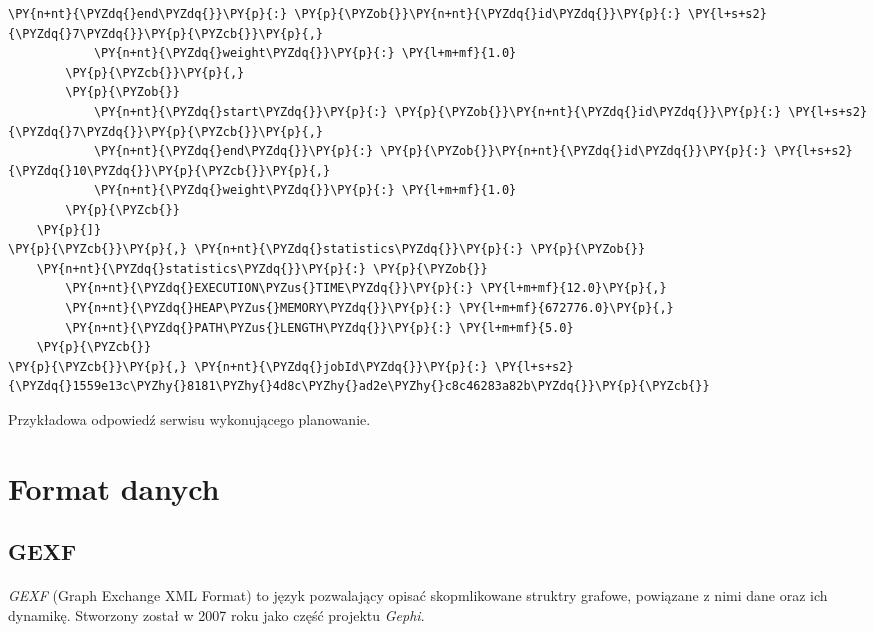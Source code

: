 \begin{program}
\begin{code}
\begin{Verbatim}[commandchars=\\\{\}]
            \PY{n+nt}{\PYZdq{}end\PYZdq{}}\PY{p}{:} \PY{p}{\PYZob{}}\PY{n+nt}{\PYZdq{}id\PYZdq{}}\PY{p}{:} \PY{l+s+s2}{\PYZdq{}7\PYZdq{}}\PY{p}{\PYZcb{}}\PY{p}{,}
            \PY{n+nt}{\PYZdq{}weight\PYZdq{}}\PY{p}{:} \PY{l+m+mf}{1.0}
        \PY{p}{\PYZcb{}}\PY{p}{,}
        \PY{p}{\PYZob{}}
            \PY{n+nt}{\PYZdq{}start\PYZdq{}}\PY{p}{:} \PY{p}{\PYZob{}}\PY{n+nt}{\PYZdq{}id\PYZdq{}}\PY{p}{:} \PY{l+s+s2}{\PYZdq{}7\PYZdq{}}\PY{p}{\PYZcb{}}\PY{p}{,}
            \PY{n+nt}{\PYZdq{}end\PYZdq{}}\PY{p}{:} \PY{p}{\PYZob{}}\PY{n+nt}{\PYZdq{}id\PYZdq{}}\PY{p}{:} \PY{l+s+s2}{\PYZdq{}10\PYZdq{}}\PY{p}{\PYZcb{}}\PY{p}{,}
            \PY{n+nt}{\PYZdq{}weight\PYZdq{}}\PY{p}{:} \PY{l+m+mf}{1.0}
        \PY{p}{\PYZcb{}}
    \PY{p}{]}
\PY{p}{\PYZcb{}}\PY{p}{,} \PY{n+nt}{\PYZdq{}statistics\PYZdq{}}\PY{p}{:} \PY{p}{\PYZob{}}
    \PY{n+nt}{\PYZdq{}statistics\PYZdq{}}\PY{p}{:} \PY{p}{\PYZob{}}
        \PY{n+nt}{\PYZdq{}EXECUTION\PYZus{}TIME\PYZdq{}}\PY{p}{:} \PY{l+m+mf}{12.0}\PY{p}{,}
        \PY{n+nt}{\PYZdq{}HEAP\PYZus{}MEMORY\PYZdq{}}\PY{p}{:} \PY{l+m+mf}{672776.0}\PY{p}{,}
        \PY{n+nt}{\PYZdq{}PATH\PYZus{}LENGTH\PYZdq{}}\PY{p}{:} \PY{l+m+mf}{5.0}
    \PY{p}{\PYZcb{}}
\PY{p}{\PYZcb{}}\PY{p}{,} \PY{n+nt}{\PYZdq{}jobId\PYZdq{}}\PY{p}{:} \PY{l+s+s2}{\PYZdq{}1559e13c\PYZhy{}8181\PYZhy{}4d8c\PYZhy{}ad2e\PYZhy{}c8c46283a82b\PYZdq{}}\PY{p}{\PYZcb{}}
\end{Verbatim}
\end{code}
\caption{Przykładowa odpowiedź serwisu wykonującego planowanie.}
\label{code:jsonresponse}
\end{program}

\section{Format danych}
\label{sec:data}

\subsection{GEXF}
\paragraph{}
{\it GEXF} (Graph Exchange XML Format) to język pozwalający opisać skopmlikowane struktry grafowe, powiązane z nimi dane oraz ich dynamikę.
Stworzony został w 2007 roku jako część projektu {\it Gephi}.

